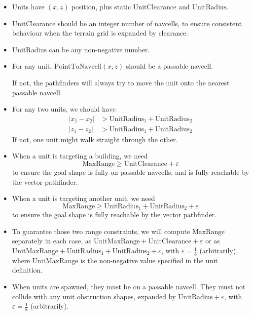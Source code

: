 \documentclass[a4paper,10pt]{article}
\begin{document}
\begin{itemize}

\item Units have $(x,z)$ position, plus static $\mathrm{UnitClearance}$ and $\mathrm{UnitRadius}$.

\item $\mathrm{UnitClearance}$ should be an integer number of navcells,
to ensure consistent behaviour when the terrain grid is expanded by clearance.

\item $\mathrm{UnitRadius}$ can be any non-negative number.

\item For any unit, $\mathrm{PointToNavcell}(x,z)$ should be a passable navcell.

If not, the pathfinders will always try to move the unit onto the nearest passable navcell.

\item For any two units, we should have
\begin{align*}
|x_1-x_2| &> \mathrm{UnitRadius}_1 + \mathrm{UnitRadius}_2 \\
|z_1-z_2| &> \mathrm{UnitRadius}_1 + \mathrm{UnitRadius}_2
\end{align*}
If not, one unit might walk straight through the other.

\item When a unit is targeting a building, we need
\[
\mathrm{MaxRange} \geq \mathrm{UnitClearance} + \varepsilon
\]
to ensure the goal shape is fully on passable navcells, and
is fully reachable by the vector pathfinder.

\item When a unit is targeting another unit, we need
\[
\mathrm{MaxRange} \geq \mathrm{UnitRadius}_1 + \mathrm{UnitRadius}_2 + \varepsilon
\]
to ensure the goal shape
is fully reachable by the vector pathfinder.

\item To guarantee those two range constraints,
we will compute $\mathrm{MaxRange}$ separately in each case,
as $\mathrm{UnitMaxRange}+\mathrm{UnitClearance}+\varepsilon$ or as
$\mathrm{UnitMaxRange}+\mathrm{UnitRadius}_1+\mathrm{UnitRadius}_2+\varepsilon$,
with $\varepsilon=\frac{1}{8}$ (arbitrarily),
where $\mathrm{UnitMaxRange}$ is the non-negative value specified in the unit definition.

\item When units are spawned,
they must be on a passable navcell.
They must not collide with any unit obstruction shapes,
expanded by $\mathrm{UnitRadius} + \varepsilon$,
with $\varepsilon=\frac{1}{8}$ (arbitrarily).


\end{itemize}
\end{document}
